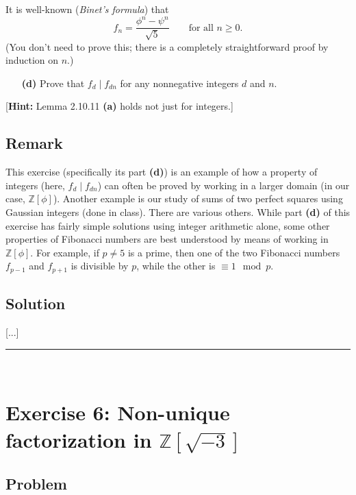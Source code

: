 \documentclass[paper=a4, fontsize=12pt]{scrartcl} %
\newcommand{\ZZ}{\mathbb{Z}} %
\newcommand{\ive}[1]{\left[ #1 \right]}
\newcommand{\horrule}[1]{\rule{\linewidth}{#1}} %
\theoremstyle{plainsl}
\theoremstyle{definition}
\theoremstyle{remark}
\begin{document}
It is well-known (\textit{Binet's formula}) that
\[
f_n = \dfrac{\phi^n - \psi^n}{\sqrt5}
\qquad \text{for all } n \geq 0 .
\]
(You don't need to prove this; there is a completely
straightforward proof by induction on $n$.)

\begin{enumerate}

\item[\textbf{(d)}]
Prove that $f_d \mid f_{dn}$ for any nonnegative integers
$d$ and $n$.

\end{enumerate}

[\textbf{Hint:} Lemma 2.10.11 \textbf{(a)} holds not just
for integers.]

\subsection{Remark}

This exercise (specifically its part \textbf{(d)}) is an
example of how a property of integers (here, $f_d \mid f_{dn}$)
can often be proved by working in a larger domain
(in our case, $\ZZ\ive{\phi}$).
Another example is our study of sums of two perfect squares
using Gaussian integers (done in class).
There are various others.
While part \textbf{(d)} of this exercise has fairly simple
solutions using integer arithmetic alone, some other properties
of Fibonacci numbers are best understood by means of working
in $\ZZ\ive{\phi}$.
For example, if $p \neq 5$ is a prime, then one of the two
Fibonacci numbers $f_{p-1}$ and $f_{p+1}$ is divisible by
$p$, while the other is $\equiv 1 \mod p$.

\subsection{Solution}

[...]

\horrule{0.3pt} \\[0.4cm]

\section{Exercise 6: Non-unique factorization in $\ZZ\ive{\sqrt{-3}}$}

\subsection{Problem}
\end{document}
